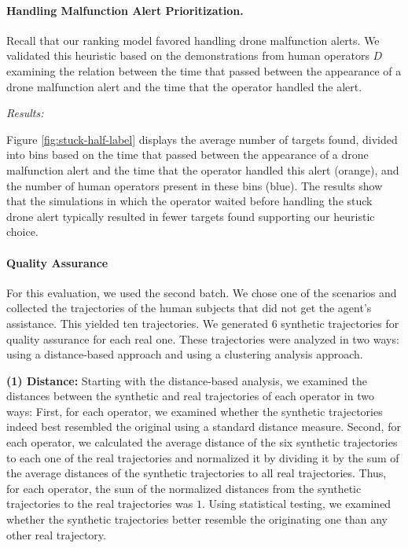 \paragraph{Handling Malfunction Alert Prioritization.}
Recall that our ranking model favored handling drone malfunction alerts. We validated this heuristic based on the demonstrations from human operators $D$ examining the relation between the time that passed between the appearance of a drone malfunction alert and the time that the operator handled the alert.

\textit{Results:}

Figure \ref{fig:stuck-half-label} displays the average number of targets found, divided into bins based on the time that passed between the appearance of a drone malfunction alert and the time that the operator handled this alert (orange), and the number of human operators present in these bins (blue). The results show that the simulations in which the operator waited before handling the stuck drone alert typically resulted in fewer targets found supporting our heuristic choice.



\paragraph{\bf Quality Assurance}
For this evaluation, we used the second batch. We chose one of the scenarios and collected the trajectories of the human subjects that did not get the agent's assistance. This yielded ten trajectories.
We generated $6$ synthetic trajectories for quality assurance for each real one. These trajectories were analyzed in two ways: using a distance-based approach and using a clustering analysis approach.  

\noindent\textbf{(1) Distance:} 
Starting with the distance-based analysis, we examined the distances between the synthetic and real trajectories of each operator in two ways: First, for each operator, we examined whether the synthetic trajectories indeed best resembled the original using a standard distance measure. Second, for each operator, we calculated the average distance of the six synthetic trajectories to each one of the real trajectories and normalized it by dividing it by the sum of the average distances of the synthetic trajectories to all real trajectories.
Thus, for each operator, the sum of the normalized distances from the synthetic trajectories to the real trajectories was $1$. Using statistical testing, we examined whether the synthetic trajectories better resemble the originating one than any other real trajectory.  

